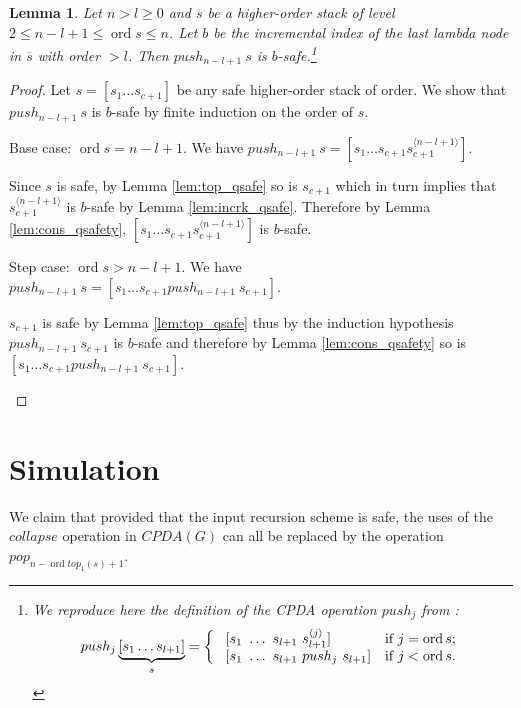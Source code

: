 \documentclass{article}
\newcommand{\ord}{\mathop{\mathrm{ord}}}
\newtheorem{lemma}{Lemma}[section]
\theoremstyle{remark}
\theoremstyle{definition}
\newcommand\orddec\overline
\begin{document}
\begin{lemma}
\label{lem:pushj_safe_implies_b-safe} Let $n>l\geq 0$ and $s$ be a higher-order stack
of level $2 \leq n-l+1 \leq \ord{s} \leq n$. Let $b$ be the incremental index of the last lambda node in $\orddec{s}$ with order $>l$. Then $push_{n-l+1}\ s$ is $b$-safe.\footnote{We reproduce here the definition of the
CPDA operation $push_j$ from \cite{hague-sto07}:
$$ push_j \underbrace{[ s_1 \ldots s_{l+1} ]}_{s} =
\left\{
  \begin{array}{ll}
\    [s_1\ \ldots\ s_{l+1}\ s_{l+1}^{\langle j \rangle}]  &\hbox{if $j = \ord{s}$;}\\
\    [s_1\ \ldots\ s_{l+1}\ push_j\ s_{l+1}]  &\hbox{if $j<\ord{s}$.}
 \end{array}
\right.
$$}
\end{lemma}
\begin{proof}
Let $s=[s_1 \ldots s_{c+1}]$ be any safe higher-order stack of order. We show that $push_{n-l+1}~s$ is $b$-safe by finite induction on the order of $s$.
    \begin{compactitem}
      \item Base case: $\ord{s} = n-l+1 $. We have
    $push_{n-l+1}~s = [ s_1 \ldots s_{c+1} s_{c+1}^{\langle n-l+1
    \rangle}]$.

    Since $s$ is safe, by Lemma \ref{lem:top_qsafe} so is $s_{c+1}$
    which in turn implies that $s_{c+1}^{\langle n-l+1\rangle}$ is
    $b$-safe by Lemma \ref{lem:incrk_qsafe}. Therefore by Lemma
    \ref{lem:cons_qsafety},  $[ s_1 \ldots s_{c+1} s_{c+1}^{\langle n-l+1
    \rangle}]$ is $b$-safe.

      \item Step case: $\ord{s} > n-l+1$. We have
    $push_{n-l+1}~s = [ s_1 \ldots s_{c+1} push_{n-l+1}~s_{c+1}]$.

    $s_{c+1}$ is safe by Lemma \ref{lem:top_qsafe} thus by the
    induction hypothesis $push_{n-l+1}~s_{c+1}$ is $b$-safe and therefore by Lemma \ref{lem:cons_qsafety} so
    is $[ s_1 \ldots s_{c+1} push_{n-l+1}~s_{c+1}]$.
    \end{compactitem}
\end{proof}





\section{Simulation}

We claim that provided that the input recursion scheme is safe, the
uses of the $collapse$ operation in $CPDA(G)$ can all be replaced by the operation $pop_{n-\ord{top_1(s)}+1}$. 
\end{document}
